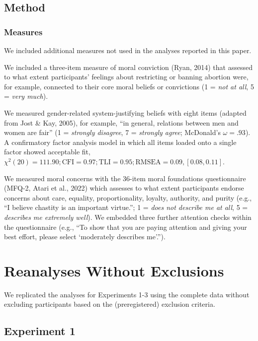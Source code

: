 \documentclass[12pt, letterpaper]{article}
\begin{document}
\hypertarget{method-1}{%
\subsection{Method}\label{method-1}}

\hypertarget{measures}{%
\subsubsection{Measures}\label{measures}}

We included additional measures not used in the analyses reported in
this paper.

We included a three-item measure of moral conviction (Ryan, 2014) that
assessed to what extent participants' feelings about restricting or
banning abortion were, for example, connected to their core moral
beliefs or convictions (1 = \emph{not at all}, 5 = \emph{very much}).

We measured gender-related system-justifying beliefs with eight items
(adapted from Jost \& Kay, 2005), for example, ``in general, relations
between men and women are fair'' (1 = \emph{strongly disagree}, 7 =
\emph{strongly agree}; McDonald's \(\omega = .93\)). A confirmatory
factor analysis model in which all items loaded onto a single factor
showed acceptable fit,
\(\chi^2 (20) = 111.90; \text{CFI} = 0.97; \text{TLI} = 0.95; \text{RMSEA} = 0.09, [0.08, 0.11]\).

We measured moral concerns with the 36-item moral foundations
questionnaire (MFQ-2, Atari et al., 2022) which assesses to what extent
participants endorse concerns about care, equality, proportionality,
loyalty, authority, and purity (e.g., ``I believe chastity is an
important virtue.''; 1 = \emph{does not describe me at all}, 5 =
\emph{describes me extremely well}). We embedded three further attention
checks within the questionnaire (e.g., ``To show that you are paying
attention and giving your best effort, please select `moderately
describes me'.'').

\hypertarget{reanalyses-without-exclusions}{%
\section{Reanalyses Without
Exclusions}\label{reanalyses-without-exclusions}}

We replicated the analyses for Experiments 1-3 using the complete data
without excluding participants based on the (preregistered) exclusion
criteria.

\hypertarget{experiment-1-1}{%
\subsection{Experiment 1}\label{experiment-1-1}}
\end{document}

